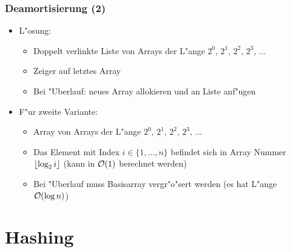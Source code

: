 \begin{frame}
  \frametitle{Deamortisierung (2)}
  \begin{itemize}
  \item L"osung:
    \begin{itemize}
    \item Doppelt verlinkte Liste von Arrays der L"ange $2^0$, $2^1$, $2^2$, $2^3$, $\ldots$
    \item Zeiger auf letztes Array
    \item Bei "Uberlauf: neues Array allokieren und an Liste anf"ugen
    \end{itemize}
  \item F"ur zweite Variante:
    \begin{itemize}
    \item Array von Arrays der L"ange $2^0$, $2^1$, $2^2$, $2^3$, $\ldots$
    \item Das Element mit Index $i \in \{1,\ldots,n\}$ befindet sich in Array Nummer
          $\lfloor\log_2 i\rfloor$
          (kann in $\mathcal{O}(1)$ berechnet werden)
    \item Bei "Uberlauf muss Basisarray vergr"o"sert werden (es hat L"ange $\mathcal{O}(\log n)$)
    \end{itemize}
  \end{itemize}
\end{frame}

\section{Hashing}

